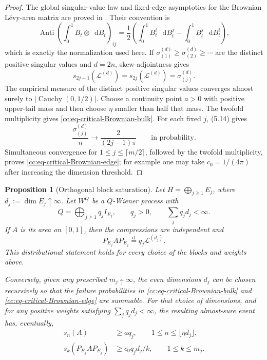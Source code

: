 \documentclass[10pt,reqno]{amsart}
\theoremstyle{plain}
\newtheorem{proposition}[theorem]{Proposition}
\theoremstyle{definition}
\theoremstyle{remark}
\begin{document}
\begin{proof}
The global singular-value law and fixed-edge asymptotics for the Brownian
L\'evy-area matrix are proved in
\cite[Sections~5.1--5.2, especially (5.1) and
(5.14)]{DelaCruzOberhauser26}.  Their convention is
\[
 \operatorname{Anti}\!\left(\int_0^1B_t\otimes\mathop{}\!\mathrm dB_t\right)_{ij}
 =\frac12\left(\int_0^1B_t^i\,\mathop{}\!\mathrm dB_t^j
              -\int_0^1B_t^j\,\mathop{}\!\mathrm dB_t^i\right),
\]
which is exactly the normalization used here.  If
\(\sigma_{(1)}^{(d)}\geq\sigma_{(2)}^{(d)}\geq\cdots\) are the distinct
positive singular values and \(d=2n\), skew-adjointness gives
\[
 s_{2j-1}(\mathcal L^{(d)})
 =s_{2j}(\mathcal L^{(d)})=\sigma_{(j)}^{(d)}.
\]
The empirical measure of the distinct positive singular values converges
almost surely to \(\lvert\operatorname{Cauchy}(0,1/2)\rvert\).  Choose a
continuity point \(a>0\) with positive upper-tail mass and then choose
\(\eta\) smaller than half that mass.  The twofold multiplicity gives
\eqref{cc:eq-critical-Brownian-bulk}.  For each fixed \(j\), (5.14) gives
\[
 \frac{\sigma_{(j)}^{(d)}}{n}
 \longrightarrow\frac{2}{(2j-1)\pi}
 \qquad\text{in probability}.
\]
Simultaneous convergence for \(1\leq j\leq\lceil m/2\rceil\), followed by
the twofold multiplicity, proves
\eqref{cc:eq-critical-Brownian-edge}; for example one may take
\(c_0=1/(4\pi)\) after increasing the dimension threshold.
\end{proof}

\begin{proposition}[Orthogonal block saturation]
\label{cc:prop-critical-block-saturation}
Let \(H=\bigoplus_{j\geq1}E_j\), where
\(d_j:=\dim E_j\uparrow\infty\).  Let \(W^Q\) be a \(Q\)-Wiener process
with
\[
 Q=\bigoplus_{j\geq1}q_jI_{E_j},
 \qquad q_j>0,\qquad\sum_jq_jd_j<\infty.
\]
If \(A\) is its area on \([0,1]\), then the compressions are independent
and
\begin{equation}
 P_{E_j}AP_{E_j}\stackrel{\mathrm d}=q_j\mathcal L^{(d_j)}.
 \label{cc:eq-critical-block-law}
\end{equation}
This distributional statement holds for every choice of the blocks and
weights above.

Conversely, given any prescribed \(m_j\uparrow\infty\), the even
dimensions \(d_j\) can be chosen recursively so that the failure
probabilities in \eqref{cc:eq-critical-Brownian-bulk} and
\eqref{cc:eq-critical-Brownian-edge} are summable.  For that choice of
dimensions, and for any positive weights satisfying
\(\sum_jq_jd_j<\infty\), the resulting almost-sure event has, eventually,
\begin{align}
 s_n(A)&\geq aq_j,\qquad
 1\leq n\leq\lfloor\eta d_j\rfloor,
 \label{cc:eq-critical-block-bulk}\\
 s_k(P_{E_j}AP_{E_j})&\geq c_0q_jd_j/k,\qquad1\leq k\leq m_j.
 \label{cc:eq-critical-block-edge}
\end{align}
\end{proposition}
\end{document}

